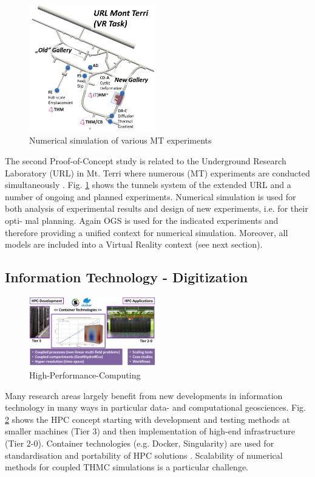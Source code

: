 \begin{figure}
\vspace{-5mm}
\centering
\includegraphics[width=0.49\textwidth]{figures/mt-vr-01a}
\caption{Numerical simulation of various MT experiments \cite{Rink20143857}}
\label{fig:mt-terri}
\end{figure}
The second Proof-of-Concept study is related to the Underground Research Laboratory (URL) in Mt. Terri where numerous (MT) experiments are conducted simultaneously \cite{Bossart2017405,Bossart20173}. Fig. \ref{fig:mt-terri} shows the tunnels system of the extended URL and a number of ongoing and planned experiments. Numerical simulation is used for both analysis of experimental results and design of new experiments, i.e. for their opti- mal planning. Again OGS is used for the indicated experiments and therefore providing a unified context for numerical simulation. Moreover, all models are included into a Virtual Reality context (see next section).

\subsection*{Information Technology - Digitization}

\begin{figure}
\vspace{-3mm}
\centering
\includegraphics[width=0.49\textwidth]{figures/hpc-concept1}
\caption{High-Performance-Computing}
\label{fig:syn-hpc}
\end{figure}
Many research areas largely benefit from new developments in information technology in many ways in particular data- and computational geosciences.
Fig. \ref{fig:syn-hpc} shows the HPC concept starting with development and testing methods at smaller machines (Tier 3) and then implementation of high-end infrastructure (Tier 2-0). Container technologies (e.g. Docker, Singularity) are used for standardisation and portability of HPC solutions \cite{Bilke2019}. Scalability of numerical methods for coupled THMC simulations is a particular challenge.

